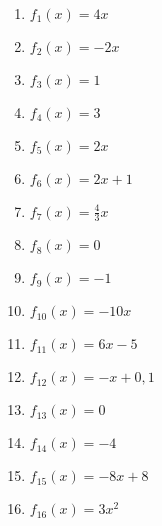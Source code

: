 \begin{Answer}[ref=ablRegelnA1]\\
	\begin{minipage}{\textwidth}
		\begin{minipage}{0.49\textwidth}
			\begin{enumerate}[label=\alph*)]
				\item \(f_1(x)=4x\)
				\item \(f_2(x)=-2x\)
				\item \(f_3(x)=1\)
				\item \(f_4(x)=3\)
				\item \(f_5(x)=2x\)
				\item \(f_6(x)=2x+1\)
				\item \(f_7(x)=\frac{4}{3}x\)
				\item \(f_8(x)=0\)
			\end{enumerate}
		\end{minipage}
		\begin{minipage}{0.49\textwidth}
			\begin{enumerate}[label=\alph*)]
				\setcounter{enumi}{8}
				\item \(f_9(x)=-1\)
				\item \(f_{10}(x)=-10x\)
				\item \(f_{11}(x)=6x-5\)
				\item \(f_{12}(x)=-x+0,1\)
				\item \(f_{13}(x)=0\)
				\item \(f_{14}(x)=-4\)
				\item \(f_{15}(x)=-8x+8\)
				\item \(f_{16}(x)=3x^2\)
			\end{enumerate}
		\end{minipage}
	\end{minipage}
\end{Answer}
